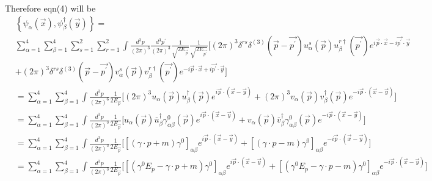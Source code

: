 \documentclass[12pt, letterpaper]{article}
\newcommand*{\1}{\hspace{1pt}}
\begin{document}
Therefore eqn(4) will be 
\begin{align*}
    &\left\{ \psi _{\alpha} (\overrightarrow{x}) , \psi ^{\dagger} _{\beta }(\overrightarrow{y})  \right\} =  \\
    & \sum_{\alpha = 1}^{4}\sum_{\beta = 1}^{4} \sum_{s = 1}^{2} \sum_{r = 1}^{2} \int \frac{d ^{3} p}{(2 \pi) ^{3}}\frac{d ^{3} p ^{\prime}}{(2 \pi) ^{3}} \frac{1}{\sqrt{2 E _{\overrightarrow{p}}}} \frac{1}{\sqrt{2 E _{\overrightarrow{p^{\prime}}}}}\bigg[ (2 \pi) ^{3} \delta ^{rs} \delta ^{(3)}(\overrightarrow{p} - \overrightarrow{p ^{\prime}}) u^{s} _{\alpha}(\overrightarrow{p})u^{r \dagger} _{\beta}(\overrightarrow{p ^{\prime}})e ^{i \overrightarrow{p} \cdot \overrightarrow{x} -i \overrightarrow{p^{\prime}} \cdot \overrightarrow{y}} \\
    & + (2 \pi) ^{3} \delta ^{rs} \delta ^{(3)}(\overrightarrow{p} - \overrightarrow{p ^{\prime}}) v^{s} _{\alpha}(\overrightarrow{p})v^{r \dagger} _{\beta}(\overrightarrow{p ^{\prime}})e ^{-i \overrightarrow{p} \cdot \overrightarrow{x} +i \overrightarrow{p^{\prime}} \cdot \overrightarrow{y}} \bigg] \\
    &= \sum_{\alpha = 1}^{4}\sum_{\beta = 1}^{4} \int \frac{d ^{3} p}{(2 \pi) ^{6}} \frac{1}{{2 E _{\overrightarrow{p}}}} \bigg[ (2 \pi) ^{3} u _{\alpha}(\overrightarrow{p})u^{\dagger} _{\beta}(\overrightarrow{p})e ^{i \overrightarrow{p} \cdot (\overrightarrow{x} - \overrightarrow{y})} + (2 \pi) ^{3} v _{\alpha}(\overrightarrow{p})v^{\dagger} _{\beta}(\overrightarrow{p})e ^{-i \overrightarrow{p} \cdot (\overrightarrow{x} - \overrightarrow{y})} \bigg] \\
    &= \sum_{\alpha = 1}^{4}\sum_{\beta = 1}^{4} \int \frac{d ^{3} p}{(2 \pi) ^{3}} \frac{1}{{2 E _{\overrightarrow{p}}}} \bigg[ u _{\alpha}(\overrightarrow{p})\overline{u}^{\dagger} _{\beta} \gamma ^{0} _{\alpha \beta}(\overrightarrow{p})e ^{i \overrightarrow{p} \cdot (\overrightarrow{x} - \overrightarrow{y})} +  v _{\alpha}(\overrightarrow{p})\overline{v}^{\dagger} _{\beta} \gamma ^{0} _{\alpha \beta}(\overrightarrow{p})e ^{-i \overrightarrow{p} \cdot (\overrightarrow{x} - \overrightarrow{y})} \bigg] \\
    &= \sum_{\alpha = 1}^{4}\sum_{\beta = 1}^{4} \int \frac{d ^{3} p}{(2 \pi) ^{3}} \frac{1}{{2 E _{\overrightarrow{p}}}} \bigg[ [(\gamma \cdot p + m)\gamma ^{0} ]_{\alpha \beta}e ^{i \overrightarrow{p} \cdot (\overrightarrow{x} - \overrightarrow{y})} + [(\gamma \cdot p - m)\gamma ^{0} ]_{\alpha \beta} e ^{-i \overrightarrow{p} \cdot (\overrightarrow{x} - \overrightarrow{y})} \bigg] \\
    &= \sum_{\alpha = 1}^{4}\sum_{\beta = 1}^{4} \int \frac{d ^{3} p}{(2 \pi) ^{3}} \frac{1}{{2 E _{\overrightarrow{p}}}} \bigg[ [(\gamma ^{0} E _{p} -\gamma \cdot p + m)\gamma ^{0} ]_{\alpha \beta}e ^{i \overrightarrow{p} \cdot (\overrightarrow{x} - \overrightarrow{y})} + [(\gamma ^{0} E _{p} -\gamma \cdot p - m)\gamma ^{0} ]_{\alpha \beta} e ^{-i \overrightarrow{p} \cdot (\overrightarrow{x} - \overrightarrow{y})} \bigg] \\
\end{align*}
\end{document}
